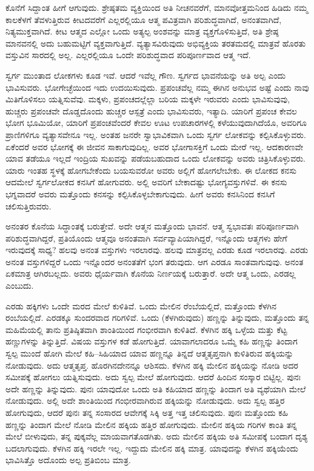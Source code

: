 ಕೊನೆಗೆ ಸಿದ್ದಾಂತ ಹೀಗೆ ಆಗುವುದು. ಶ್ರೇಷ್ಠತಮ ವ್ಯಕ್ತಿಯಿಂದ ಅತಿ ನೀಚನವರೆಗೆ, ಮಾನವೋತ್ತಮನಿಂದ ಹಿಡಿದು ನಮ್ಮ ಕಾಲಕೆಳಗೆ ತೆವಳುತ್ತಿರುವ ಕೀಟದವರೆಗೆ ಎಲ್ಲರಲ್ಲಿಯೂ ಆತ್ಮ ಪವಿತ್ರವಾಗಿ ಪರಿಶುದ್ಧವಾಗಿದೆ, ಅನಂತವಾಗಿದೆ, ನಿತ್ಯಮುಕ್ತವಾಗಿದೆ. ಕೀಟ ಆತ್ಮದ ಎಲ್ಲೋ ಒಂದು ಅತ್ಯಲ್ಪ ಅಂಶವನ್ನು ಮಾತ್ರ ವ್ಯಕ್ತಗೊಳಿಸುತ್ತಿದೆ, ಅತಿ ಶ್ರೇಷ್ಠ ಮಾನವನಲ್ಲಿ ಅದು ಬಹುಮಟ್ಟಿಗೆ ವ್ಯಕ್ತವಾಗುತ್ತಿದೆ. ವ್ಯತ್ಯಾಸವಿರುವುದು ಅಭಿವ್ಯಕ್ತಿಯ ತರತಮದಲ್ಲಿ ಮಾತ್ರವೆ ಹೊರತು ವಸ್ತುವಿನ ಸಾರದಲ್ಲಿ ಅಲ್ಲ. ಎಲ್ಲರಲ್ಲಿಯೂ ಒಂದೇ ಪರಿಶುದ್ಧವಾದ ಪರಿಪೂರ್ಣವಾದ ಆತ್ಮ ಇದೆ.

ಸ್ವರ್ಗ ಮುಂತಾದ ಲೋಕಗಳು ಕೂಡ ಇವೆ. ಆದರೆ ಇವೆಲ್ಲ ಗೌಣ. ಸ್ವರ್ಗದ ಭಾವನೆಯನ್ನು ಅತಿ ಅಲ್ಪ ಎಂದು ಭಾವಿಸುವರು. ಭೋಗೇಚ್ಛೆಯಿಂದ ಇದು ಉದಯಿಸುವುದು. ಪ್ರಪಂಚವೆಲ್ಲ ನಮ್ಮ ಈಗಿನ ಅನುಭವ ಅಷ್ಟೆ ಎಂದು ನಾವು ಮಿತಿಗೊಳಿಸಲು ಯತ್ನಿಸುವೆವು. ಮಕ್ಕಳು, ಪ್ರಪಂಚದಲ್ಲೆಲ್ಲಾ ಬರಿಯ ಮಕ್ಕಳೇ ಇರುವರು ಎಂದು ಭಾವಿಸುವುವು, ಹುಚ್ಚರು ಪ್ರಪಂಚವೇ ದೊಡ್ಡದೊಂದು ಹುಚ್ಚರ ಆಸ್ಪತ್ರೆ ಎಂದು ಭಾವಿಸುವರು, ಇತ್ಯಾದಿ. ಯಾರಿಗೆ ಪ್ರಪಂಚ ಕೇವಲ ಭೋಗ ಭೂಮಿಯೋ, ಯಾರಿಗೆ ಪ್ರಪಂಚವೆಂದರೆ ಕೇವಲ ಊಟ ಉಪಚಾರಗಳಲ್ಲಿ ಕಳೆಯುವುದಾಗಿದೆಯೊ, ಅವರಿಗೂ ಪ್ರಾಣಿಗಳಿಗೂ ವ್ಯತ್ಯಾಸವೇನೂ ಇಲ್ಲ. ಅಂತಹ ಜನರೇ ಸ್ವಾಭಾವಿಕವಾಗಿ ಒಂದು ಸ್ವರ್ಗ ಲೋಕವನ್ನು ಕಲ್ಪಿಸಿಕೊಳ್ಳುವರು. ಏಕೆಂದರೆ ಅವರ ಭೋಗಕ್ಕೆ ಈ ಜೀವನ ಸಾಕಾಗುವುದಿಲ್ಲ. ಅವರ ಭೋಗಾಸಕ್ತಿಗೆ ಒಂದು ಮೇರೆ ಇಲ್ಲ. ಆದಕಾರಣವೇ ಯಾವ ತಡೆಯೂ ಇಲ್ಲದೆ ಇಂದ್ರಿಯ ಸುಖವನ್ನು ಪಡೆಯಬಹುದಾದ ಒಂದು ಲೋಕವನ್ನು ಅವರು ಚಿತ್ರಿಸಿಕೊಳ್ಳುವರು. ಯಾರು ಇಂತಹ ಸ್ಥಳಕ್ಕೆ ಹೋಗಬೇಕೆಂದು ಬಯಸುವರೋ ಅವರು ಅಲ್ಲಿಗೆ ಹೋಗಲೇಬೇಕು. ಈ ಲೋಕದ ಕನಸು ಆದಮೇಲೆ ಸ್ವರ್ಗಲೋಕದ ಕನಸಿಗೆ ಹೋಗುವರು. ಅಲ್ಲಿ ಅವರಿಗೆ ಬೇಕಾದಷ್ಟು ಭೋಗ್ಯವಸ್ತುಗಳಿವೆ. ಈ ಕನಸು ಭಗ್ನವಾದರೆ ಅವರು ಮತ್ತೊಂದು ಕನಸನ್ನು ಕಲ್ಪಿಸಿಕೊಳ್ಳಬೇಕಾಗುವುದು. ಹೀಗೆ ಅವರು ಕನಸಿನಿಂದ ಕನಸಿಗೆ ಚಲಿಸುತ್ತಿರುವರು.

ಅನಂತರ ಕೊನೆಯ ಸಿದ್ಧಾಂತಕ್ಕೆ ಬರುತ್ತೇವೆ. ಅದೇ ಆತ್ಮನ ಮತ್ತೊಂದು ಭಾವನೆ. ಆತ್ಮ ಸ್ವಭಾವತಃ ಪರಿಪೂರ್ಣವಾಗಿ ಪರಿಶುದ್ಧವಾಗಿದ್ದರೆ, ಪ್ರತಿಯೊಂದು ಆತ್ಮವೂ ಅನಂತವಾಗಿ ಸರ್ವವ್ಯಾಪಿಯಾಗಿದ್ದರೆ, ಇನ್ನೊಂದು ಆತ್ಮಗಳು ಹೇಗೆ ಇರುವುದಕ್ಕೆ ಸಾಧ್ಯ? ಹಲವು ಅನಂತ ವಸ್ತುಗಳು ಇರಲಾರವು. ಹಲವು ಮಾತ್ರವಲ್ಲ ಎರಡು ಕೂಡ ಇರಲಾರವು. ಎರಡು ಅನಂತ ವಸ್ತುಗಳಿದ್ದರೆ ಒಂದು ಇನ್ನೊಂದರ ಅನಂತತೆಗೆ ಭಂಗ ತರುವುದು. ಆಗ ಎರಡೂ ಸಾಂತವಾಗುವುವು. ಅನಂತ ಏಕಮಾತ್ರ ಆಗಿರಬಲ್ಲದು. ಅವರು ಧೈರ್ಯವಾಗಿ ಕೊನೆಯ ನಿರ್ಣಯಕ್ಕೆ ಬರುತ್ತಾರೆ. ಅದೇ ಆತ್ಮ ಒಂದು, ಎರಡಲ್ಲ ಎಂಬುದು.

ಎರಡು ಹಕ್ಕಿಗಳು ಒಂದೇ ಮರದ ಮೇಲೆ ಕುಳಿತಿವೆ. ಒಂದು ಮೇಲಿನ ರೆಂಬೆಯಲ್ಲಿದೆ, ಮತ್ತೊಂದು ಕೆಳಗಿನ ರಂಬೆಯಲ್ಲಿದೆ. ಎರಡಕ್ಕೂ ಸುಂದರವಾದ ಗರಿಗಳಿವೆ. ಒಂದು (ಕೆಳಗಿರುವುದು) ಹಣ್ಣನ್ನು ತಿನ್ನುವುದು, ಮತ್ತೊಂದು ತನ್ನ ಮಹಿಮೆಯಲ್ಲಿ ತಾನು ಪ್ರತಿಷ್ಠಿತವಾಗಿ ಶಾಂತಿಯಿಂದ ಗಂಭೀರವಾಗಿ ಕುಳಿತಿದೆ. ಕೆಳಗಿನ ಹಕ್ಕಿ ಒಳ್ಳೆಯ ಮತ್ತು ಕೆಟ್ಟ ಹಣ್ಣುಗಳನ್ನು ತಿನ್ನುತ್ತಿದೆ. ವಿಷಯ ವಸ್ತುಗಳ ಕಡೆ ಹೋಗುತ್ತಿದೆ. ಯಾವಾಗಲಾದರೂ ಒಮ್ಮೆ ಕಹಿ ಹಣ್ಣನ್ನು ತಿಂದಾಗ ಸ್ವಲ್ಪ ಮುಂದೆ ಹೋಗಿ ಮೇಲೆ ಕಹಿ–ಸಿಹಿಯಾದ ಯಾವ ಹಣ್ಣನ್ನೂ ತಿನ್ನದೆ ಆತ್ಮತೃಪ್ತನಾಗಿ ಕುಳಿತಿರುವ ಹಕ್ಕಿಯನ್ನು ನೋಡುವುದು. ಅದು ಆತ್ಮತೃಪ್ತ. ಹೊರಗಿನದೇನನ್ನೂ ಆಶಿಸದು. ಕೆಳಗಿನ ಹಕ್ಕಿ ಮೇಲಿನ ಹಕ್ಕಿಯನ್ನು ನೋಡಿ ಅದರ ಸಮೀಪಕ್ಕೆ ಹೋಗಲು ಯತ್ನಿಸುವುದು. ಅದು ಸ್ವಲ್ಪ ಮೇಲೆ ಹೋಗುವುದು. ಆದರೆ ಹಿಂದಿನ ಸಂಸ್ಕಾರ ಬಿಟ್ಟಿಲ್ಲ. ಪುನಃ ಅದೇ ಹಣ್ಣನ್ನು ತಿನ್ನುವುದು. ಪುನಃ ಯಾವುದೋ ಒಂದು ಅತಿ ಕಹಿಯಾದ ಹಣ್ಣನ್ನು ತಿಂದಾಗ ಅತಿ ವ್ಯಥೆಯಾಗಿ ಮೇಲೆ ನೋಡುವುದು. ಅಲ್ಲಿ ಅದೇ ಶಾಂತಿಯಿಂದ ಗಂಭೀರವಾಗಿರುವ ಹಕ್ಕಿಯನ್ನು ನೋಡುವುದು. ಅದು ಸ್ವಲ್ಪ ಹತ್ತಿರ ಹೋಗುವುದು, ಆದರೆ ಪುನಃ ತನ್ನ ಸಂಸಾರದ ಆವೇಗಕ್ಕೆ ಸಿಕ್ಕಿ ಅತ್ತ ಇತ್ತ ಚಲಿಸುವುದು. ಪುನಃ ಮತ್ತೊಂದು ಕಹಿ ಹಣ್ಣನ್ನು ತಿಂದಾಗ ಮೇಲೆ ನೋಡಿ ಮೇಲಿನ ಹಕ್ಕಿಯ ಹತ್ತಿರ ಹೋಗುವುದು. ಮೇಲಿನ ಹಕ್ಕಿಯ ಗರಿಗಳ ಕಾಂತಿ ತನ್ನ ಮೇಲೆ ಬೀಳುವುದು, ತನ್ನ ಪುಕ್ಕವೆಲ್ಲ ಮಾಯವಾಗತೊಡಗಿತು. ಅದು ಮೇಲಿನ ಹಕ್ಕಿಯ ಅತಿ ಸಮೀಪಕ್ಕೆ ಬಂದಾಗ ದೃಶ್ಯ ಬದಲಾಗುವುದು. ಕೆಳಗಿನ ಹಕ್ಕಿ ಇರಲೇ ಇಲ್ಲ. ಇದ್ದುದು ಮೇಲಿನ ಹಕ್ಕಿ ಮಾತ್ರ. ಯಾವುದನ್ನು ಕೆಳಗಿನ ಹಕ್ಕಿಯೆಂದು ಭಾವಿಸಿತ್ತೊ ಅದೊಂದು ಅಲ್ಪ ಪ್ರತಿಬಿಂಬ ಮಾತ್ರ.

